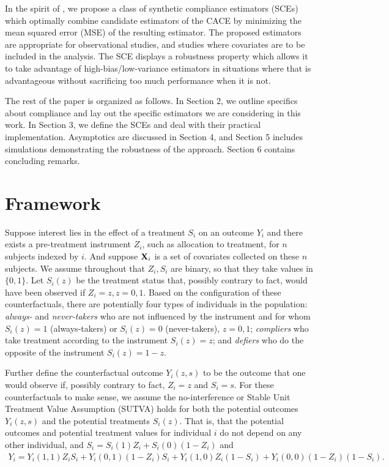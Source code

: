 \documentclass{article}
\begin{document}
In the spirit of \citet{antonelli2017synthetic}, we propose a class of synthetic compliance estimators (SCEs) which optimally combine candidate estimators of the CACE by minimizing the mean squared error (MSE) of the resulting estimator. The proposed estimators are appropriate for observational studies, and studies where covariates are to be included in the analysis.  The SCE displays a robustness property which allows it to take advantage of high-bias/low-variance estimators in situations where that is advantageous without sacrificing too  much performance when it is not. %

The rest of the paper is organized as follows. In Section 2, we outline specifics about compliance and lay out the specific estimators we are considering in this work. In Section 3, we define the SCEs and deal with their practical implementation. Asymptotics are discussed in Section 4, and Section 5 includes simulations demonstrating the robustness of the approach. Section 6 contains concluding remarks.


\section{Framework}
Suppose interest lies in the effect of a treatment $S_i$ on an outcome $Y_i$ and there exists a pre-treatment instrument $Z_i$, such as allocation to treatment, for $n$ subjects indexed by $i$. And suppose ${\bf X}_i$ is a set of covariates collected on these $n$ subjects. We assume throughout that $Z_i, S_i$ are binary, so that they take values in $\{0, 1\}$. Let $S_i(z)$ be the treatment status that, possibly contrary to fact, would have been observed if $Z_i = z, z = 0, 1$. Based on the configuration of these counterfactuals, there are potentially four types of individuals in the population: \textit{always-} and \textit{never-takers} who are not influenced by the instrument and for whom $S_i(z) = 1$ (always-takers) or $S_i(z) = 0$ (never-takers), $z = 0, 1$; \textit{compliers} who take treatment according to the instrument $S_i(z) = z$; and \textit{defiers} who do the opposite of the instrument $S_i(z) = 1 - z$. 

Further define the counterfactual outcome $Y_i(z, s)$ to be the outcome that one would observe if, possibly contrary to fact, $Z_i = z$ and $S_i = s$. For these counterfactuals to make sense, we assume the no-interference or Stable Unit Treatment Value Assumption (SUTVA) holds \citep{rubin1978bayesian} for both the potential outcomes $Y_i(z,s)$ and the potential treatments $S_i(z)$. That is, that the potential outcomes and potential treatment values for individual $i$ do not depend on any other individual, and $S_i = S_i(1)Z_i + S_i(0)(1-Z_i)$ and 
\begin{align*}
    Y_i = Y_i(1, 1)Z_iS_i + Y_i(0, 1)(1-Z_i)S_i + Y_i(1, 0)Z_i(1-S_i) + Y_i(0, 0)(1-Z_i)(1-S_i).
\end{align*} 
\end{document}
